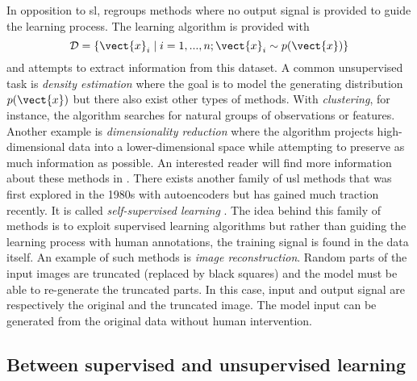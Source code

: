 In opposition to \acrlong{sl},  regroups methods where no output
signal is provided to guide the learning process. The learning algorithm is provided
with
\begin{equation}
\mathcal{D} = \left\{\vect{x}_i \mid i = 1,..., n ; \vect{x}_i \sim p(\vect{x})\right\}
\end{equation}
and attempts to extract information from this dataset. A common unsupervised task
is \textit{density estimation} where the goal is to model the generating distribution
$p(\vect{x})$ but there also exist other types of methods. With \textit{clustering},
for instance, the algorithm searches for natural groups of observations or features.
Another example is \textit{dimensionality reduction} where the algorithm projects
high-dimensional data into a lower-dimensional space while attempting to preserve
as much information as possible. An interested reader will find more information
about these methods in \cite{hastie2017elements}. There exists another
family of \acrlong{usl} methods that was first explored in the 1980s with autoencoders
\cite{ballard1987modular, le1987modeles, bourlard1988auto} but has gained much traction recently. It is called \textit{self-supervised learning}
\cite{lecun2021self}. The idea behind this family of methods is to exploit
supervised learning algorithms but rather than guiding the learning process with
human annotations, the training signal is found in the data itself. An example of
such methods is \textit{image reconstruction}. Random parts of the input images
are truncated (\eg replaced by black squares) and the model must be able to
re-generate the truncated parts. In this case, input and output signal are
respectively the original and the truncated image. The model input can be generated
from the original data without human intervention.

\subsection{Between supervised and unsupervised learning}
\label{ssec:backml:inbetween}

